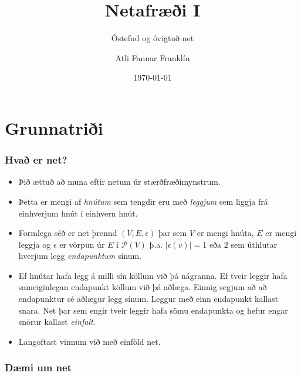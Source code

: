 \documentclass{beamer}
\title{Netafræði I}
\subtitle{Óstefnd og óvigtuð net}
\author{Atli Fannar Franklín}
\date{\today}
\newcommand\abs[1]{\left|#1\right|}
\begin{document}
\frame{\titlepage}

\section[Grunnatriði]{Grunnatriði}

\begin{frame}
\frametitle{Hvað er net?}

\begin{itemize}

\item<1-> Þið ættuð að muna eftir netum úr stærðfræðimynstrum.

\item<2-> Þetta er mengi af \textit{hnútum} sem tengdir eru með \textit{leggjum} sem liggja frá einhverjum hnút í einhvern hnút. 

\item<3-> Formlega séð er net þrennd $(V, E, \epsilon)$ þar sem $V$ er mengi hnúta, $E$ er mengi leggja og $\epsilon$ er vörpun úr $E$ í $\mathcal{P}(V)$ þ.a. $\abs{\epsilon(v)} = 1 \textrm{ eða } 2$ sem úthlutar hverjum legg \textit{endapunktum} sínum.

\item<4-> Ef hnútar hafa legg á milli sín köllum við þá nágranna. Ef tveir leggir hafa sameiginlegan endapunkt köllum við þá aðlæga. Einnig segjum að að endapunktur sé aðlægur legg sínum. Leggur með einn endapunkt kallast snara. Net þar sem engir tveir leggir hafa sömu endapunkta og hefur engar snörur kallast \textit{einfalt}.

\item<5-> Langoftast vinnum við með einföld net.

\end{itemize}

\end{frame}

\begin{frame}
\frametitle{Dæmi um net}

\begin{center}
\hspace*{-1.5cm}
\end{center}

\end{frame}
\end{document}
